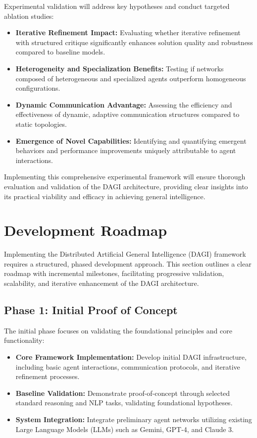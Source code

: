 \documentclass[12pt]{amsart}
\begin{document}
Experimental validation will address key hypotheses and conduct targeted ablation studies:

\begin{itemize}
    \item \textbf{Iterative Refinement Impact:} Evaluating whether iterative refinement with structured critique significantly enhances solution quality and robustness compared to baseline models.
    \item \textbf{Heterogeneity and Specialization Benefits:} Testing if networks composed of heterogeneous and specialized agents outperform homogeneous configurations.
    \item \textbf{Dynamic Communication Advantage:} Assessing the efficiency and effectiveness of dynamic, adaptive communication structures compared to static topologies.
    \item \textbf{Emergence of Novel Capabilities:} Identifying and quantifying emergent behaviors and performance improvements uniquely attributable to agent interactions.
\end{itemize}

Implementing this comprehensive experimental framework will ensure thorough evaluation and validation of the DAGI architecture, providing clear insights into its practical viability and efficacy in achieving general intelligence.


\section{Development Roadmap}

Implementing the Distributed Artificial General Intelligence (DAGI) framework requires a structured, phased development approach. This section outlines a clear roadmap with incremental milestones, facilitating progressive validation, scalability, and iterative enhancement of the DAGI architecture.

\subsection{Phase 1: Initial Proof of Concept}

The initial phase focuses on validating the foundational principles and core functionality:

\begin{itemize}
    \item \textbf{Core Framework Implementation:} Develop initial DAGI infrastructure, including basic agent interactions, communication protocols, and iterative refinement processes.
    \item \textbf{Baseline Validation:} Demonstrate proof-of-concept through selected standard reasoning and NLP tasks, validating foundational hypotheses.
    \item \textbf{System Integration:} Integrate preliminary agent networks utilizing existing Large Language Models (LLMs) such as Gemini, GPT-4, and Claude 3.
\end{itemize}
\end{document}
